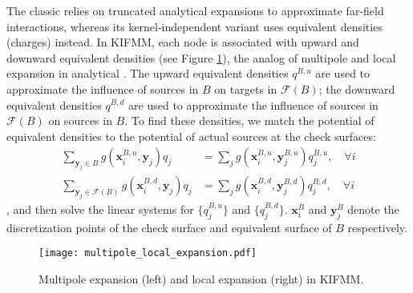 The classic \fmm \cite{greengard1987fast, cheng1999fast} relies on truncated analytical expansions to approximate far-field interactions, whereas its kernel-independent variant \cite{ying2004kernel} uses equivalent densities (charges) instead.
In KIFMM, each node is associated with upward and downward equivalent densities (see Figure \ref{fig:multipole_local}), the analog of multipole and local expansion in analytical \fmm.
The upward equivalent densities $q^{B,u}$ are used to approximate the influence of sources in $B$ on targets in $\mathcal{F}(B)$;
the downward equivalent densities $q^{B,d}$ are used to approximate the influence of sources in $\mathcal{F}(B)$ on sources in $B$.
To find these densities, we match the potential of equivalent densities to the potential of actual sources at the check surfaces:
%
\begin{align}\label{eq:multipole_local}
    \sum_{\mathbf{y}_{j} \in B} g\left(\mathbf{x}_{i}^{B,u}, \mathbf{y}_{j}\right) q_{j} &= \sum_{j} g\left(\mathbf{x}_{i}^{B,u}, \mathbf{y}^{B,u}_{j}\right) q^{B,u}_{j}, \quad \forall i  \nonumber \\
    \sum_{\mathbf{y}_{j} \in \mathcal{F}(B)} g\left(\mathbf{x}_{i}^{B,d}, \mathbf{y}_{j}\right) q_{j} &= \sum_{j} g\left(\mathbf{x}_{i}^{B,d}, \mathbf{y}^{B,d}_{j}\right) q^{B,d}_{j}, \quad \forall i
\end{align}
%
, and then solve the linear systems for $\{q^{B,u}_{j}\}$ and $\{q^{B,d}_{j}\}$.
$\mathbf{x}_{i}^{B}$ and $\mathbf{y}_{j}^{B}$ denote the discretization points of the check surface and equivalent surface of $B$ respectively.

\begin{figure}
    \centering
    \texttt{[image: multipole\_local\_expansion.pdf]}
    \caption{Multipole expansion (left) and local expansion (right) in KIFMM.}
    \label{fig:multipole_local}
\end{figure}

